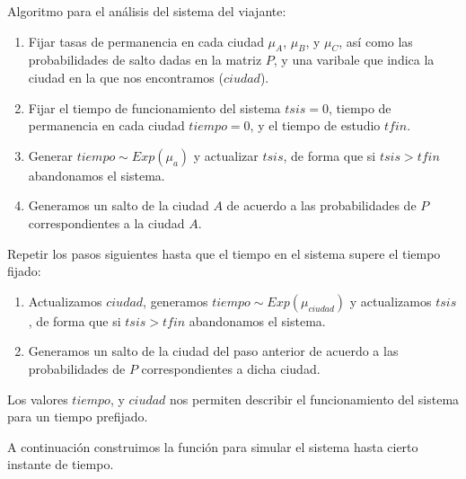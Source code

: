 \documentclass[
]{book}
\providecommand{\tightlist}{%
  \setlength{\itemsep}{0pt}\setlength{\parskip}{0pt}}
\newenvironment{silverbox}{
  \definecolor{shadecolor}{rgb}{192, 192, 192}  
  \color{black}
  \begin{shaded}}
 {\end{shaded}}
\theoremstyle{definition}
\theoremstyle{definition}
\theoremstyle{definition}
\theoremstyle{definition}
\theoremstyle{remark}
\begin{document}
\begin{silverbox}
Algoritmo para el análisis del sistema del viajante:

\begin{enumerate}
\def\labelenumi{\arabic{enumi}.}
\tightlist
\item
  Fijar tasas de permanencia en cada ciudad \(\mu_A\), \(\mu_B\), y \(\mu_C\), así como las probabilidades de salto dadas en la matriz \(P\), y una varibale que indica la ciudad en la que nos encontramos (\(ciudad\)).
\item
  Fijar el tiempo de funcionamiento del sistema \(tsis = 0\), tiempo de permanencia en cada ciudad \(tiempo = 0\), y el tiempo de estudio \(tfin\).
\item
  Generar \(tiempo \sim Exp(\mu_a)\) y actualizar \(tsis\), de forma que si \(tsis > tfin\) abandonamos el sistema.
\item
  Generamos un salto de la ciudad \(A\) de acuerdo a las probabilidades de \(P\) correspondientes a la ciudad \(A\).
\end{enumerate}

Repetir los pasos siguientes hasta que el tiempo en el sistema supere el tiempo fijado:

\begin{enumerate}
\def\labelenumi{\arabic{enumi}.}
\setcounter{enumi}{4}
\tightlist
\item
  Actualizamos \(ciudad\), generamos \(tiempo \sim Exp(\mu_{ciudad})\) y actualizamos \(tsis\), de forma que si \(tsis > tfin\) abandonamos el sistema.
\item
  Generamos un salto de la ciudad del paso anterior de acuerdo a las probabilidades de \(P\) correspondientes a dicha ciudad.
\end{enumerate}

Los valores \(tiempo\), y \(ciudad\) nos permiten describir el funcionamiento del sistema para un tiempo prefijado.

\end{silverbox}

A continuación construimos la función para simular el sistema hasta cierto instante de tiempo.
\end{document}
